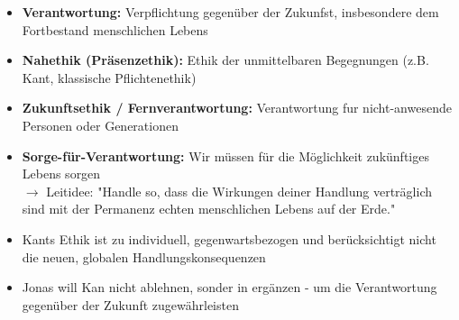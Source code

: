 \begin{itemize}
    \item \textbf{Verantwortung:} Verpflichtung gegenüber der Zukunfst, insbesondere dem Fortbestand menschlichen Lebens
    \item \textbf{Nahethik (Präsenzethik):} Ethik der unmittelbaren Begegnungen (z.B. Kant, klassische Pflichtenethik)
    \item \textbf{Zukunftsethik / Fernverantwortung:} Verantwortung fur nicht-anwesende Personen oder Generationen
    \item \textbf{Sorge-für-Verantwortung:} Wir müssen für die Möglichkeit zukünftiges Lebens sorgen \\
    $\rightarrow$ Leitidee: "Handle so, dass die Wirkungen deiner Handlung verträglich sind mit der Permanenz echten menschlichen Lebens auf der Erde."
\end{itemize}


\begin{itemize}
    \item Kants Ethik ist zu individuell, gegenwartsbezogen und berücksichtigt nicht die neuen, globalen Handlungskonsequenzen
    \item Jonas will Kan nicht ablehnen, sonder in ergänzen - um die Verantwortung gegenüber der Zukunft zugewährleisten
\end{itemize}

